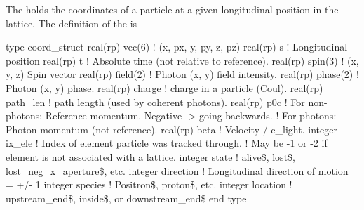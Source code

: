 The  holds the coordinates of a particle at a given
longitudinal position in the lattice. The definition of the
 is
\begin{example}
  type coord_struct
    real(rp) vec(6)     ! (x, px, y, py, z, pz)
    real(rp) s          ! Longitudinal position
    real(rp) t          ! Absolute time (not relative to reference).
    real(rp) spin(3)    ! (x, y, z) Spin vector
    real(rp) field(2)   ! Photon (x, y) field intensity.
    real(rp) phase(2)   ! Photon (x, y) phase.
    real(rp) charge     ! charge in a particle (Coul).
    real(rp) path_len   ! path length (used by coherent photons).
    real(rp) p0c        ! For non-photons: Reference momentum. Negative -> going backwards.
                        !     For photons: Photon momentum (not reference).
    real(rp) beta       ! Velocity / c_light. 
    integer ix_ele      ! Index of element particle was tracked through.
                        !   May be -1 or -2 if element is not associated with a lattice.
    integer state       ! alive\$, lost\$, lost_neg_x_aperture\$, etc.
    integer direction   ! Longitudinal direction of motion = +/- 1
    integer species     ! Positron\$, proton\$, etc.
    integer location    ! upstream_end\$, inside\$, or downstream_end\$
end type
\end{example}

